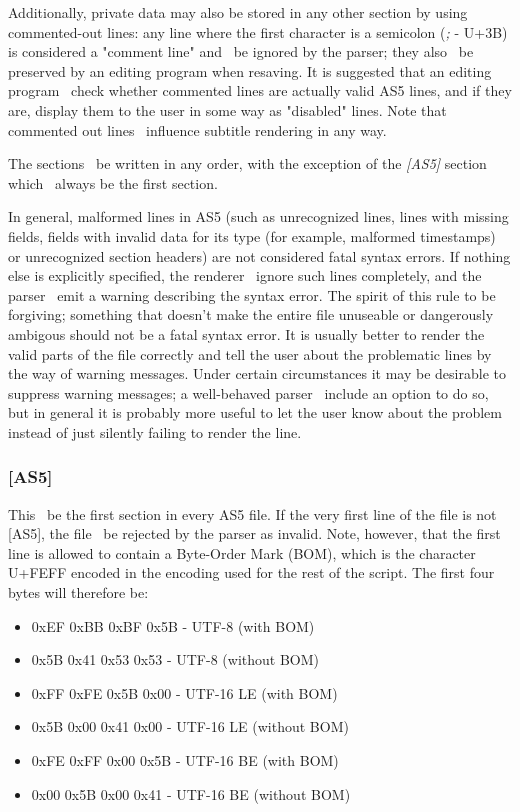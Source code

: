 \documentclass{spec}
\begin{document}
Additionally, private data may also be stored in any other section by using commented-out
lines: any line where the first character is a semicolon (\textit{;} - U+3B) is considered a
"comment line" and \must\ be ignored by the parser; they also \must\ be preserved by an editing program
when resaving. It is suggested that an editing program \should\ check whether commented lines are
actually valid AS5 lines, and if they are, display them to the user in some way as "disabled" lines.
Note that commented out lines \mustnot\ influence subtitle rendering in any way.

The sections \may\ be written in any order, with the exception of the \emph{[AS5]} section which
\must\ always be the first section.

In general, malformed lines in AS5 (such as unrecognized lines, lines with missing fields, fields
with invalid data for its type (for example, malformed timestamps) or unrecognized section headers)
are not considered fatal syntax errors. If nothing else is explicitly specified, the renderer \must\
ignore such lines completely, and the parser \should\ emit a warning describing the syntax error. The
spirit of this rule to be forgiving; something that doesn't make the entire file unuseable or dangerously
ambigous should not be a fatal syntax error. It is usually better to render the valid parts of the file
correctly and tell the user about the problematic lines by the way of warning messages. Under certain
circumstances it may be desirable to suppress warning messages; a well-behaved parser \should\ include
an option to do so, but in general it is probably more useful to let the user know about the problem
instead of just silently failing to render the line.

\subsubsection{[AS5]}
This \must\ be the first section in every AS5 file. If the very first line of the file is not
[AS5], the file \must\ be rejected by the parser as invalid. Note, however, that the first
line is allowed to contain a Byte-Order Mark (BOM), which is the character U+FEFF encoded in
the encoding used for the rest of the script\cite{Unicode BOM}. The first four bytes will therefore be:

\begin{itemize}
\item 0xEF 0xBB 0xBF 0x5B - UTF-8 (with BOM)
\item 0x5B 0x41 0x53 0x53 - UTF-8 (without BOM)
\item 0xFF 0xFE 0x5B 0x00 - UTF-16 LE (with BOM)
\item 0x5B 0x00 0x41 0x00 - UTF-16 LE (without BOM)
\item 0xFE 0xFF 0x00 0x5B - UTF-16 BE (with BOM)
\item 0x00 0x5B 0x00 0x41 - UTF-16 BE (without BOM)
\end{itemize}
\end{document}
